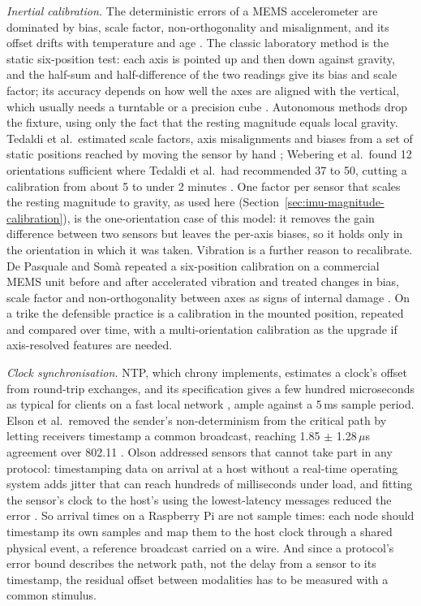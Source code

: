 \emph{Inertial calibration.} The deterministic errors of a MEMS accelerometer are dominated by bias, scale factor, non-orthogonality and misalignment, and its offset drifts with temperature and age \cite{ru2022}. The classic laboratory method is the static six-position test: each axis is pointed up and then down against gravity, and the half-sum and half-difference of the two readings give its bias and scale factor; its accuracy depends on how well the axes are aligned with the vertical, which usually needs a turntable or a precision cube \cite{ru2022}. Autonomous methods drop the fixture, using only the fact that the resting magnitude equals local gravity. Tedaldi et al.\ estimated scale factors, axis misalignments and biases from a set of static positions reached by moving the sensor by hand \cite{tedaldi2014}; Webering et al.\ found 12 orientations sufficient where Tedaldi et al.\ had recommended 37 to 50, cutting a calibration from about 5 to under 2 minutes \cite{webering2022}. One factor per sensor that scales the resting magnitude to gravity, as used here (Section~\ref{sec:imu-magnitude-calibration}), is the one-orientation case of this model: it removes the gain difference between two sensors but leaves the per-axis biases, so it holds only in the orientation in which it was taken. Vibration is a further reason to recalibrate. De Pasquale and Som\`a repeated a six-position calibration on a commercial MEMS unit before and after accelerated vibration and treated changes in bias, scale factor and non-orthogonality between axes as signs of internal damage \cite{depasquale2010}. On a trike the defensible practice is a calibration in the mounted position, repeated and compared over time, with a multi-orientation calibration as the upgrade if axis-resolved features are needed.

\emph{Clock synchronisation.} NTP, which chrony implements, estimates a clock's offset from round-trip exchanges, and its specification gives a few hundred microseconds as typical for clients on a fast local network \cite{rfc5905}, ample against a 5\,ms sample period. Elson et al.\ removed the sender's non-determinism from the critical path by letting receivers timestamp a common broadcast, reaching 1.85 $\pm$ 1.28\,$\mu$s agreement over 802.11 \cite{elson2002}. Olson addressed sensors that cannot take part in any protocol: timestamping data on arrival at a host without a real-time operating system adds jitter that can reach hundreds of milliseconds under load, and fitting the sensor's clock to the host's using the lowest-latency messages reduced the error \cite{olson2010}. So arrival times on a Raspberry Pi are not sample times: each node should timestamp its own samples and map them to the host clock through a shared physical event, a reference broadcast carried on a wire. And since a protocol's error bound describes the network path, not the delay from a sensor to its timestamp, the residual offset between modalities has to be measured with a common stimulus.


